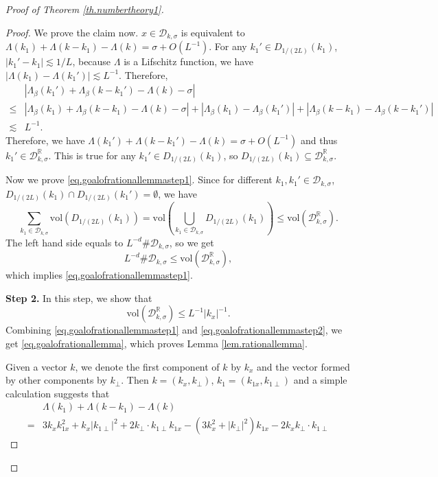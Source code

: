 \begin{proof}[Proof of Theorem \ref{th.numbertheory1}]
\begin{proof}
We prove the claim now. $x\in \mathcal{D}_{k,\sigma}$ is equivalent to $\Lambda(k_1)+\Lambda(k-k_1)-\Lambda(k)=\sigma+O(L^{-1})$. For any $k_1'\in D_{1/(2L)}(k_1)$, $|k_1'-k_1|\lesssim 1/L$, because $\Lambda$ is a Lifschitz function, we have $|\Lambda(k_1)-\Lambda(k_1')|\lesssim L^{-1}$. Therefore, 
\begin{equation}
\begin{split}
    &|\Lambda_{\beta}(k_1')+\Lambda_{\beta}(k-k_1')-\Lambda(k)-\sigma|
    \\
    \le &|\Lambda_{\beta}(k_1)+\Lambda_{\beta}(k-k_1)-\Lambda(k)-\sigma|+|\Lambda_{\beta}(k_1)-\Lambda_{\beta}(k_1')|+|\Lambda_{\beta}(k-k_1)-\Lambda_{\beta}(k-k_1')|
    \\
    \lesssim & L^{-1}.
\end{split}
\end{equation}
Therefore, we have $\Lambda(k_1')+\Lambda(k-k_1')-\Lambda(k)=\sigma+O(L^{-1})$ and thus $k_1'\in \mathcal{D}^{\mathbb{R}}_{k,\sigma}$. This is true for any $k_1'\in D_{1/(2L)}(k_1)$, so $D_{1/(2L)}(k_1)\subseteq \mathcal{D}^{\mathbb{R}}_{k,\sigma}$.

Now we prove \eqref{eq.goalofrationallemmastep1}. Since for different $k_1,k_1'\in \mathcal{D}_{k,\sigma}$, $D_{1/(2L)}(k_1)\cap D_{1/(2L)}(k_1')=\emptyset$, we have 
\begin{equation}
    \sum_{k_1\in \mathcal{D}_{k,\sigma}} \text{vol}( D_{1/(2L)}(k_1))=\text{vol}\left( \bigcup_{k_1\in \mathcal{D}_{k,\sigma}} D_{1/(2L)}(k_1)\right)\le \text{vol}(\mathcal{D}^{\mathbb{R}}_{k,\sigma}).
\end{equation}
The left hand side equals to $L^{-d}\#\mathcal{D}_{k,\sigma}$, so we get
\begin{equation}
    L^{-d}\#\mathcal{D}_{k,\sigma}\le \text{vol}(\mathcal{D}^{\mathbb{R}}_{k,\sigma}),
\end{equation}
which implies \eqref{eq.goalofrationallemmastep1}.

\textbf{Step 2.} In this step, we show that 
\begin{equation}\label{eq.goalofrationallemmastep2}
    \text{vol}(\mathcal{D}^{\mathbb{R}}_{k,\sigma})\le L^{-1} |k_x|^{-1}.
\end{equation}
Combining \eqref{eq.goalofrationallemmastep1} and \eqref{eq.goalofrationallemmastep2}, we get
\eqref{eq.goalofrationallemma}, which proves Lemma \ref{lem.rationallemma}.

Given a vector $k$, we denote the first component of $k$ by $k_x$ and the vector formed by other components by $k_{\perp}$. Then $k=(k_x, k_{\perp})$, $k_1=(k_{1x}, k_{1\perp})$ and a simple calculation suggests that
\begin{equation}\label{eq.A11}
\begin{split}
    &\Lambda(k_1)+\Lambda(k-k_1)-\Lambda(k)
 \\
 =&3k_xk_{1x}^2+k_x|k_{1\perp}|^2+2k_{\perp}\cdot k_{1\perp}k_{1x}-(3k_x^2+|k_{\perp}|^2)k_{1x}-2k_x k_{\perp}\cdot k_{1\perp}
\end{split}
\end{equation}


\end{proof}
\end{proof}
